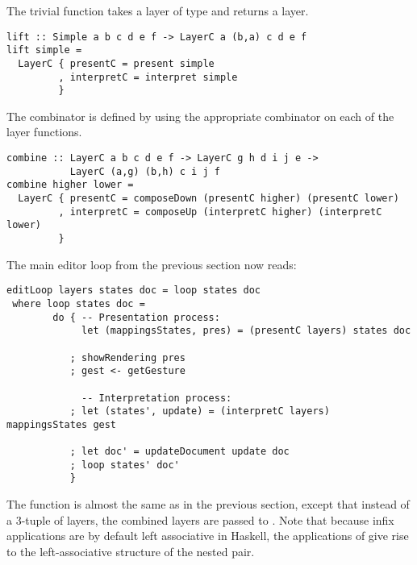 The trivial function  takes a layer of type  and returns a  layer.

\begin{small}
\begin{verbatim}
lift :: Simple a b c d e f -> LayerC a (b,a) c d e f
lift simple = 
  LayerC { presentC = present simple
         , interpretC = interpret simple
         }
\end{verbatim}
\end{small}

The  combinator is defined by using the appropriate  combinator on each of the layer functions. 

\begin{small}
\begin{verbatim}
combine :: LayerC a b c d e f -> LayerC g h d i j e -> 
           LayerC (a,g) (b,h) c i j f
combine higher lower =
  LayerC { presentC = composeDown (presentC higher) (presentC lower)
         , interpretC = composeUp (interpretC higher) (interpretC lower)
         }
\end{verbatim}
\end{small}



The main editor loop from the previous section now reads:
 
 \begin{small}
 \begin{verbatim}
editLoop layers states doc = loop states doc
 where loop states doc = 
        do { -- Presentation process:
             let (mappingsStates, pres) = (presentC layers) states doc
           
           ; showRendering pres
           ; gest <- getGesture
 
             -- Interpretation process:
           ; let (states', update) = (interpretC layers) mappingsStates gest
       
           ; let doc' = updateDocument update doc
           ; loop states' doc'
           }
\end{verbatim}
\end{small}

The  function is almost the same as in the previous section, except that instead of a 3-tuple of layers, the combined layers are passed to . Note that because infix applications are by default left associative in Haskell, the applications of  give rise to the left-associative structure of the nested pair.

